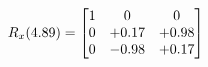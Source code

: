\documentclass[preview]{standalone}
\begin{document}
\begin{align*}
\special{dvisvgm:raw <g id='unique000'>}R_{x}(4.89) = \begin{bmatrix}1 & 0 & 0 \\0 & +0.17 & +0.98 \\0 & -0.98 & +0.17\end{bmatrix}\special{dvisvgm:raw </g>}
\end{align*}
\end{document}
